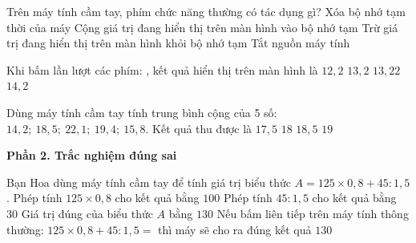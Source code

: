 \begin{ex} %
Trên máy tính cầm tay, phím chức năng  thường có tác dụng gì?
\choice
{Xóa bộ nhớ tạm thời của máy}
{\True Cộng giá trị đang hiển thị trên màn hình vào bộ nhớ tạm}
{Trừ giá trị đang hiển thị trên màn hình khỏi bộ nhớ tạm}
{Tắt nguồn máy tính}
\end{ex}

\begin{ex} %
Khi bấm lần lượt các phím:    \fbox{$\times$}    \fbox{=}, kết quả hiển thị trên màn hình là
\choice
{$12{,}2$}
{\True $13{,}2$}
{$13{,}22$}
{$14{,}2$}
\end{ex}

\begin{ex} %
Dùng máy tính cầm tay tính trung bình cộng của 5 số: $14{,}2;\ 18{,}5;\ 22{,}1;\ 19{,}4;\ 15{,}8$. Kết quả thu được là
\choice
{$17{,}5$}
{\True $18$}
{$18{,}5$}
{$19$}
\end{ex}

\textbf{Phần 2. Trắc nghiệm đúng sai}

\begin{ex} %
Bạn Hoa dùng máy tính cầm tay để tính giá trị biểu thức $A = 125 \times 0{,}8 + 45 : 1{,}5$.
\choiceTF
{\True Phép tính $125 \times 0{,}8$ cho kết quả bằng $100$}
{\True Phép tính $45 : 1{,}5$ cho kết quả bằng $30$}
{\True Giá trị đúng của biểu thức $A$ bằng $130$}
{Nếu bấm liên tiếp trên máy tính thông thường: $125 \times 0{,}8 + 45 : 1{,}5 =$ thì máy sẽ cho ra đúng kết quả $130$}
\end{ex}

